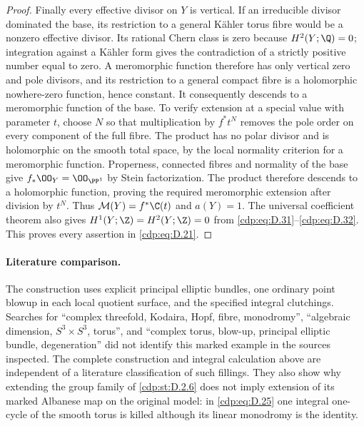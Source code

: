 \begin{proof}
Finally every effective divisor on $Y$ is vertical. If an
irreducible divisor dominated the base, its restriction
to a general K\"ahler torus fibre would be a nonzero
effective divisor. Its rational Chern class is zero
because $H^2(Y;\Q)=0$; integration against a K\"ahler
form gives the contradiction of a strictly positive
number equal to zero. A meromorphic function therefore
has only vertical zero and pole divisors, and its
restriction to a general compact fibre is a holomorphic
nowhere-zero function, hence constant. It consequently
descends to a meromorphic function of the base. To verify
extension at a special value with parameter $t$, choose
$N$ so that multiplication by $f^*t^N$ removes the pole
order on every component of the full fibre. The product
has no polar divisor and is holomorphic on the smooth
total space, by the local normality criterion for a
meromorphic function. Properness, connected fibres and
normality of the base give $f_*\OO_Y=\OO_{\PP^1}$ by
Stein factorization. The product therefore descends to a
holomorphic function, proving the required meromorphic
extension after division by $t^N$. Thus
$\mathcal M(Y)=f^*\C(t)$ and $a(Y)=1$.
The universal coefficient theorem also gives
$H^1(Y;\Z)=H^2(Y;\Z)=0$ from \eqref{cdp:eq:D.31}--\eqref{cdp:eq:D.32}.
This proves every assertion in \eqref{cdp:eq:D.21}.
\end{proof}

\paragraph{Literature comparison.}
The construction uses explicit principal elliptic bundles,
one ordinary point blowup in each local quotient surface,
and the specified integral clutchings. Searches for
``complex threefold, Kodaira, Hopf, fibre, monodromy'',
``algebraic dimension, $S^3\times S^3$, torus'', and
``complex torus, blow-up, principal elliptic bundle,
degeneration'' did not identify this marked example in
the sources inspected. 
The complete construction and integral calculation above
are independent of a literature classification of such
fillings. They also show why extending the group family
of \ref{cdp:st:D.2.6} does not imply extension of its marked Albanese
map on the original model: in \eqref{cdp:eq:D.25} one integral
one-cycle of the smooth torus is killed although its
linear monodromy is the identity.


